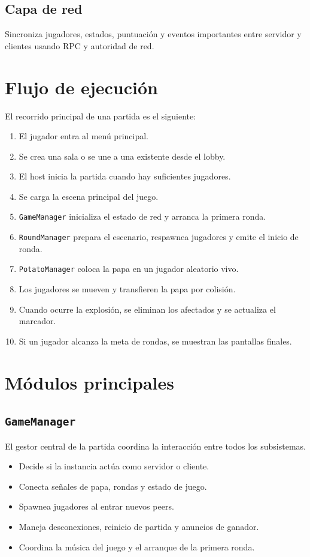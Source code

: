 \documentclass[11pt,a4paper]{article}
\begin{document}
\subsection{Capa de red}
Sincroniza jugadores, estados, puntuación y eventos importantes entre servidor y clientes usando RPC y autoridad de red.

\section{Flujo de ejecución}
El recorrido principal de una partida es el siguiente:
\begin{enumerate}[nosep]
    \item El jugador entra al menú principal.
    \item Se crea una sala o se une a una existente desde el lobby.
    \item El host inicia la partida cuando hay suficientes jugadores.
    \item Se carga la escena principal del juego.
    \item \texttt{GameManager} inicializa el estado de red y arranca la primera ronda.
    \item \texttt{RoundManager} prepara el escenario, respawnea jugadores y emite el inicio de ronda.
    \item \texttt{PotatoManager} coloca la papa en un jugador aleatorio vivo.
    \item Los jugadores se mueven y transfieren la papa por colisión.
    \item Cuando ocurre la explosión, se eliminan los afectados y se actualiza el marcador.
    \item Si un jugador alcanza la meta de rondas, se muestran las pantallas finales.
\end{enumerate}

\section{Módulos principales}

\subsection{\texttt{GameManager}}
El gestor central de la partida coordina la interacción entre todos los subsistemas.
\begin{itemize}[nosep]
    \item Decide si la instancia actúa como servidor o cliente.
    \item Conecta señales de papa, rondas y estado de juego.
    \item Spawnea jugadores al entrar nuevos peers.
    \item Maneja desconexiones, reinicio de partida y anuncios de ganador.
    \item Coordina la música del juego y el arranque de la primera ronda.
\end{itemize}
\end{document}
